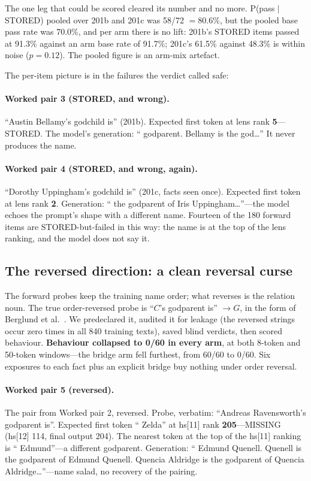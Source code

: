 \documentclass[11pt]{article}
\begin{document}
The one leg that could be scored cleared its number and no more.
P(pass $\mid$ STORED) pooled over 201b and 201c was 58/72 $= 80.6\%$,
but the pooled base pass rate was 70.0\%, and per arm there is no lift:
201b's STORED items passed at 91.3\% against an arm base rate of
91.7\%; 201c's 61.5\% against 48.3\% is within noise ($p = 0.12$). The
pooled figure is an arm-mix artefact.

The per-item picture is in the failures the verdict called safe:

\paragraph{Worked pair 3 (STORED, and wrong).}
``Austin Bellamy's godchild is'' (201b). Expected first token at lens
rank \textbf{5}---STORED. The model's generation: `` godparent.
Bellamy is the god\ldots'' It never produces the name.

\paragraph{Worked pair 4 (STORED, and wrong, again).}
``Dorothy Uppingham's godchild is'' (201c, facts seen once). Expected
first token at lens rank \textbf{2}. Generation: `` the godparent of
Iris Uppingham\ldots''---the model echoes the prompt's shape with a
different name. Fourteen of the 180 forward items are STORED-but-failed
in this way: the name is at the top of the lens ranking, and the model
does not say it.

\subsection{The reversed direction: a clean reversal curse}

The forward probes keep the training name order; what reverses is the
relation noun. The true order-reversed probe is ``$C$'s godparent
is'' $\to G$, in the form of Berglund et al.\ \cite{berglund2023}. We
predeclared it, audited it for leakage (the reversed strings occur zero
times in all 840 training texts), saved blind verdicts, then scored
behaviour. \textbf{Behaviour collapsed to 0/60 in every arm}, at both
8-token and 50-token windows---the bridge arm fell furthest, from 60/60
to 0/60. Six exposures to each fact plus an explicit bridge buy nothing
under order reversal.

\paragraph{Worked pair 5 (reversed).}
The pair from Worked pair 2, reversed. Probe, verbatim: ``Andreas
Ravensworth's godparent is''. Expected first token `` Zelda'' at
hs[11] rank \textbf{205}---MISSING (hs[12] 114, final output 204). The
nearest token at the top of the hs[11] ranking is `` Edmund''---a
different godparent. Generation: `` Edmund Quenell. Quenell is the
godparent of Edmund Quenell. Quencia Aldridge is the godparent of
Quencia Aldridge\ldots''---name salad, no recovery of the pairing.
\end{document}
